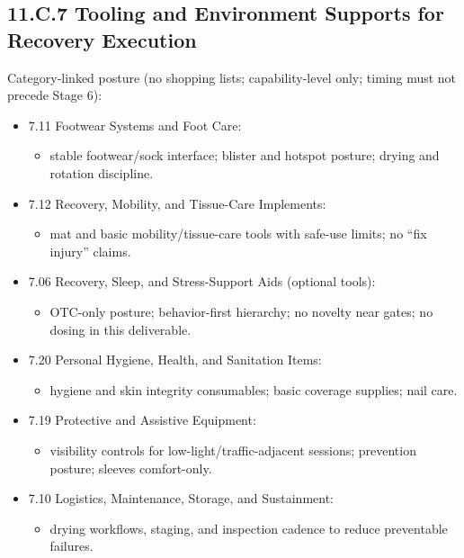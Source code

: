 \documentclass[10pt]{article}
\begin{document}
\newpage

\subsection*{11.C.7 Tooling and Environment Supports for Recovery Execution}
{}

Category-linked posture (no shopping lists; capability-level only; timing must not precede Stage 6):

\begin{itemize}
\item 7.11 Footwear Systems and Foot Care:
\begin{itemize}
\item stable footwear/sock interface; blister and hotspot posture; drying and rotation discipline.
\end{itemize}
\item 7.12 Recovery, Mobility, and Tissue-Care Implements:
\begin{itemize}
\item mat and basic mobility/tissue-care tools with safe-use limits; no “fix injury” claims.
\end{itemize}
\item 7.06 Recovery, Sleep, and Stress-Support Aids (optional tools):
\begin{itemize}
\item OTC-only posture; behavior-first hierarchy; no novelty near gates; no dosing in this deliverable.
\end{itemize}
\item 7.20 Personal Hygiene, Health, and Sanitation Items:
\begin{itemize}
\item hygiene and skin integrity consumables; basic coverage supplies; nail care.
\end{itemize}
\item 7.19 Protective and Assistive Equipment:
\begin{itemize}
\item visibility controls for low-light/traffic-adjacent sessions; prevention posture; sleeves comfort-only.
\end{itemize}
\item 7.10 Logistics, Maintenance, Storage, and Sustainment:
\begin{itemize}
\item drying workflows, staging, and inspection cadence to reduce preventable failures.
\end{itemize}
\end{itemize}
\end{document}
